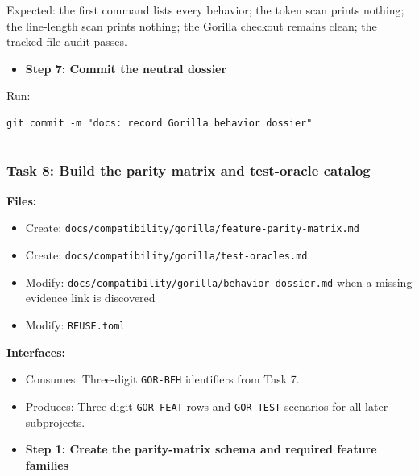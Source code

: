 \documentclass[
  letterpaper,
]{article}
\newcommand{\passthrough}[1]{#1}
\providecommand{\tightlist}{%
  \setlength{\itemsep}{0pt}\setlength{\parskip}{0pt}}
\begin{document}
Expected: the first command lists every behavior; the token scan prints nothing; the line-length scan prints nothing;
the Gorilla checkout remains clean; the tracked-file audit passes.

\begin{itemize}
\tightlist
\item[$\boxtimes$]
  \textbf{Step 7: Commit the neutral dossier}
\end{itemize}

Run:

\begin{lstlisting}
git commit -m "docs: record Gorilla behavior dossier"
\end{lstlisting}

\begin{center}\rule{0.5\linewidth}{0.5pt}\end{center}

\subsubsection{Task 8: Build the parity matrix and test-oracle
catalog}\label{task-8-build-the-parity-matrix-and-test-oracle-catalog}

\textbf{Files:}

\begin{itemize}
\tightlist
\item
  Create: \nolinkurl{docs/compatibility/gorilla/feature-parity-matrix.md}
\item
  Create: \nolinkurl{docs/compatibility/gorilla/test-oracles.md}
\item
  Modify: \nolinkurl{docs/compatibility/gorilla/behavior-dossier.md} when a missing evidence link is discovered
\item
  Modify: \nolinkurl{REUSE.toml}
\end{itemize}

\textbf{Interfaces:}

\begin{itemize}
\tightlist
\item
  Consumes: Three-digit \passthrough{\lstinline!GOR-BEH!} identifiers from Task 7.
\item
  Produces: Three-digit \passthrough{\lstinline!GOR-FEAT!} rows and \passthrough{\lstinline!GOR-TEST!} scenarios for all
  later subprojects.
\end{itemize}

\begin{itemize}
\tightlist
\item[$\boxtimes$]
  \textbf{Step 1: Create the parity-matrix schema and required feature families}
\end{itemize}
\end{document}
